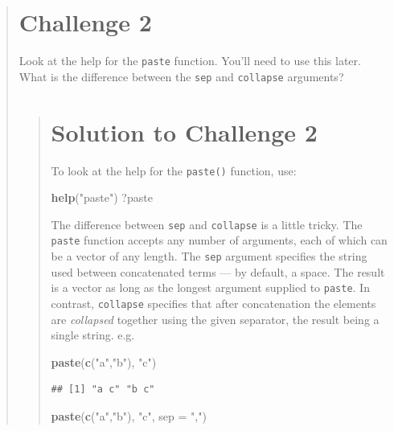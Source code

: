 \documentclass[]{book}
\newenvironment{Shaded}{\begin{snugshade}}{\end{snugshade}}
\newcommand{\KeywordTok}[1]{\textcolor[rgb]{0.13,0.29,0.53}{\textbf{#1}}}
\newcommand{\DataTypeTok}[1]{\textcolor[rgb]{0.13,0.29,0.53}{#1}}
\newcommand{\StringTok}[1]{\textcolor[rgb]{0.31,0.60,0.02}{#1}}
\newcommand{\NormalTok}[1]{#1}
\begin{document}
\begin{quote}
\section{Challenge 2}\label{challenge-2-1}

Look at the help for the \texttt{paste} function. You'll need to use
this later. What is the difference between the \texttt{sep} and
\texttt{collapse} arguments?

\begin{quote}
\section{Solution to Challenge 2}\label{solution-to-challenge-2-1}

To look at the help for the \texttt{paste()} function, use:

\begin{Shaded}
\begin{Highlighting}[]
\KeywordTok{help}\NormalTok{(}\StringTok{"paste"}\NormalTok{)}
\NormalTok{?paste}
\end{Highlighting}
\end{Shaded}

The difference between \texttt{sep} and \texttt{collapse} is a little
tricky. The \texttt{paste} function accepts any number of arguments,
each of which can be a vector of any length. The \texttt{sep} argument
specifies the string used between concatenated terms --- by default, a
space. The result is a vector as long as the longest argument supplied
to \texttt{paste}. In contrast, \texttt{collapse} specifies that after
concatenation the elements are \emph{collapsed} together using the given
separator, the result being a single string. e.g.

\begin{Shaded}
\begin{Highlighting}[]
\KeywordTok{paste}\NormalTok{(}\KeywordTok{c}\NormalTok{(}\StringTok{"a"}\NormalTok{,}\StringTok{"b"}\NormalTok{), }\StringTok{"c"}\NormalTok{)}
\end{Highlighting}
\end{Shaded}

\begin{verbatim}
## [1] "a c" "b c"
\end{verbatim}

\begin{Shaded}
\begin{Highlighting}[]
\KeywordTok{paste}\NormalTok{(}\KeywordTok{c}\NormalTok{(}\StringTok{"a"}\NormalTok{,}\StringTok{"b"}\NormalTok{), }\StringTok{"c"}\NormalTok{, }\DataTypeTok{sep =} \StringTok{","}\NormalTok{)}
\end{Highlighting}
\end{Shaded}


\end{quote}
\end{quote}
\end{document}
